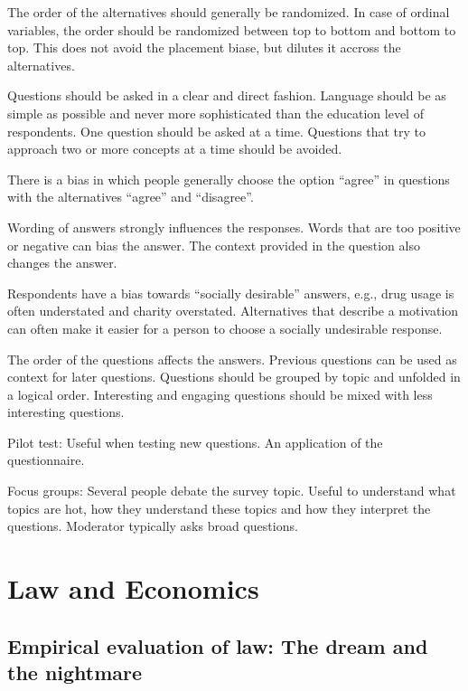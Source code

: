 \documentclass[]{report}
\theoremstyle{definition}
\theoremstyle{definition}
\theoremstyle{definition}
\theoremstyle{remark}
\begin{document}
The order of the alternatives should generally be randomized. In case of
ordinal variables, the order should be randomized between top to bottom
and bottom to top. This does not avoid the placement biase, but dilutes
it accross the alternatives.

Questions should be asked in a clear and direct fashion. Language should
be as simple as possible and never more sophisticated than the education
level of respondents. One question should be asked at a time. Questions
that try to approach two or more concepts at a time should be avoided.

There is a bias in which people generally choose the option ``agree'' in
questions with the alternatives ``agree'' and ``disagree''.

Wording of answers strongly influences the responses. Words that are too
positive or negative can bias the answer. The context provided in the
question also changes the answer.

Respondents have a bias towards ``socially desirable'' answers, e.g.,
drug usage is often understated and charity overstated. Alternatives
that describe a motivation can often make it easier for a person to
choose a socially undesirable response.

The order of the questions affects the answers. Previous questions can
be used as context for later questions. Questions should be grouped by
topic and unfolded in a logical order. Interesting and engaging
questions should be mixed with less interesting questions.

Pilot test: Useful when testing new questions. An application of the
questionnaire.

Focus groups: Several people debate the survey topic. Useful to
understand what topics are hot, how they understand these topics and how
they interpret the questions. Moderator typically asks broad questions.

\chapter{Law and Economics}\label{law-and-economics}

\section{Empirical evaluation of law: The dream and the
nightmare}\label{empirical-evaluation-of-law-the-dream-and-the-nightmare}

\citep{donohue2015empirical}
\end{document}
